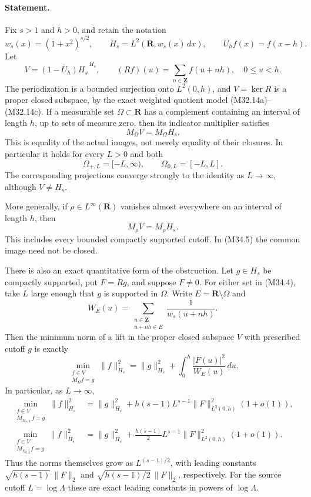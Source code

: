 \paragraph{Statement.}
Fix $s>1$ and $h>0$, and retain the notation
\[
 w_s(x)=(1+x^2)^{s/2},\qquad
 H_s=L^2(\mathbf R,w_s(x)\,dx),\qquad
 U_hf(x)=f(x-h).
 \tag{M34.1}
\]
Let
\[
 V=\overline{(1-U_h)H_s}^{\,H_s},\qquad
 (Rf)(u)=\sum_{n\in\mathbf Z}f(u+nh),\quad0\le u<h.
 \tag{M34.2}
\]
The periodization is a bounded surjection onto $L^2(0,h)$,
and $V=\ker R$ is a proper closed subspace, by the exact
weighted quotient model (M32.14a)--(M32.14c).
If a measurable set $\Omega\subset\mathbf R$ has a
complement containing an interval of length $h$, up to
sets of measure zero, then its indicator multiplier satisfies
\[
               M_\Omega V=M_\Omega H_s.
 \tag{M34.3}
\]
This is equality of the actual images, not merely equality
of their closures.  In particular it holds for every $L>0$
and both
\[
 \Omega_{+,L}=[-L,\infty),\qquad
 \Omega_{0,L}=[-L,L].
 \tag{M34.4}
\]
The corresponding projections converge strongly to the
identity as $L\to\infty$, although $V\ne H_s$.

More generally, if $\rho\in L^\infty(\mathbf R)$ vanishes
almost everywhere on an interval of length $h$, then
\[
                   M_\rho V=M_\rho H_s.
 \tag{M34.5}
\]
This includes every bounded compactly supported cutoff.
In (M34.5) the common image need not be closed.

There is also an exact quantitative form of the obstruction.
Let $g\in H_s$ be compactly supported, put $F=Rg$, and
suppose $F\ne0$.  For either set in (M34.4), take $L$
large enough that $g$ is supported in $\Omega$.  Write
$E=\mathbf R\setminus\Omega$ and
\[
 W_E(u)=\sum_{\substack{n\in\mathbf Z\\u+nh\in E}}
                   \frac1{w_s(u+nh)}.
 \tag{M34.6}
\]
Then the minimum norm of a lift in the proper closed
subspace $V$ with prescribed cutoff $g$ is exactly
\[
 \min_{\substack{f\in V\\M_\Omega f=g}}\|f\|_{H_s}^2
       =\|g\|_{H_s}^2+
                      \int_0^h\frac{|F(u)|^2}{W_E(u)}\,du.
 \tag{M34.7}
\]
In particular, as $L\to\infty$,
\[
 \begin{split}
 \min_{\substack{f\in V\\M_{\Omega_{+,L}}f=g}}
                 \|f\|_{H_s}^2
  &=\|g\|_{H_s}^2+
        h(s-1)L^{s-1}\|F\|_{L^2(0,h)}^2(1+o(1)),\\
 \min_{\substack{f\in V\\M_{\Omega_{0,L}}f=g}}
                 \|f\|_{H_s}^2
  &=\|g\|_{H_s}^2+
       \frac{h(s-1)}2L^{s-1}\|F\|_{L^2(0,h)}^2(1+o(1)).
 \end{split}
 \tag{M34.8}
\]
Thus the norms themselves grow as $L^{(s-1)/2}$,
with leading constants $\sqrt{h(s-1)}\,\|F\|_2$
and $\sqrt{h(s-1)/2}\,\|F\|_2$, respectively.
For the source cutoff $L=\log\Lambda$ these are exact
leading constants in powers of $\log\Lambda$.

